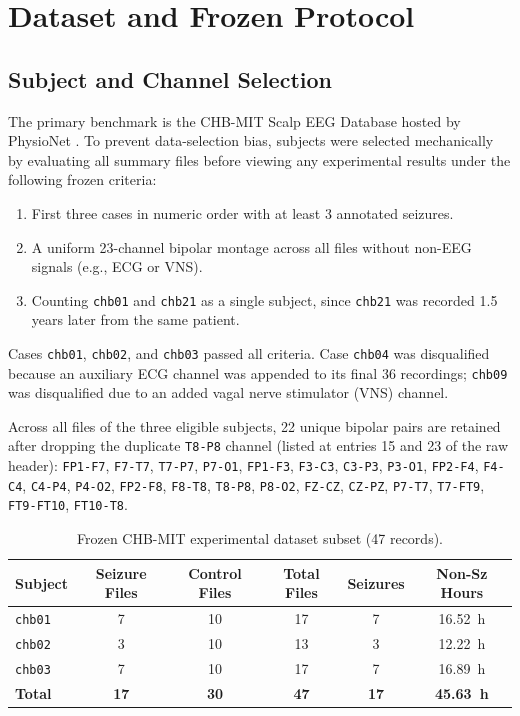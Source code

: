 \documentclass[10pt,twocolumn,letterpaper]{article}
\begin{document}
\section{Dataset and Frozen Protocol}
\label{sec:dataset}

\subsection{Subject and Channel Selection}
The primary benchmark is the CHB-MIT Scalp EEG Database hosted by PhysioNet \cite{guttag2010chbmit,goldberger2000physiobank}. To prevent data-selection bias, subjects were selected mechanically by evaluating all summary files before viewing any experimental results under the following frozen criteria:
\begin{enumerate}
    \item First three cases in numeric order with at least 3 annotated seizures.
    \item A uniform 23-channel bipolar montage across all files without non-EEG signals (e.g., ECG or VNS).
    \item Counting \texttt{chb01} and \texttt{chb21} as a single subject, since \texttt{chb21} was recorded 1.5 years later from the same patient.
\end{enumerate}

Cases \texttt{chb01}, \texttt{chb02}, and \texttt{chb03} passed all criteria. Case \texttt{chb04} was disqualified because an auxiliary ECG channel was appended to its final 36 recordings; \texttt{chb09} was disqualified due to an added vagal nerve stimulator (VNS) channel. 

Across all files of the three eligible subjects, 22 unique bipolar pairs are retained after dropping the duplicate \texttt{T8-P8} channel (listed at entries 15 and 23 of the raw header):
\texttt{FP1-F7}, \texttt{F7-T7}, \texttt{T7-P7}, \texttt{P7-O1}, \texttt{FP1-F3}, \texttt{F3-C3}, \texttt{C3-P3}, \texttt{P3-O1}, \texttt{FP2-F4}, \texttt{F4-C4}, \texttt{C4-P4}, \texttt{P4-O2}, \texttt{FP2-F8}, \texttt{F8-T8}, \texttt{T8-P8}, \texttt{P8-O2}, \texttt{FZ-CZ}, \texttt{CZ-PZ}, \texttt{P7-T7}, \texttt{T7-FT9}, \texttt{FT9-FT10}, \texttt{FT10-T8}.

\begin{table}[t]
\centering
\small
\caption{Frozen CHB-MIT experimental dataset subset (47 records).}
\label{tab:dataset}
\begin{tabularx}{\columnwidth}{lccccc}
\toprule
\textbf{Subject} & \textbf{Seizure Files} & \textbf{Control Files} & \textbf{Total Files} & \textbf{Seizures} & \textbf{Non-Sz Hours} \\
\midrule
\texttt{chb01} & 7 & 10 & 17 & 7 & 16.52~h \\
\texttt{chb02} & 3 & 10 & 13 & 3 & 12.22~h \\
\texttt{chb03} & 7 & 10 & 17 & 7 & 16.89~h \\
\midrule
\textbf{Total} & \textbf{17} & \textbf{30} & \textbf{47} & \textbf{17} & \textbf{45.63~h} \\
\bottomrule
\end{tabularx}
\end{table}
\end{document}
